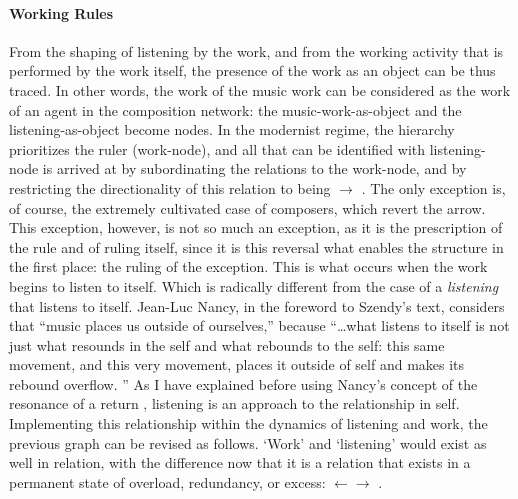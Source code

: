 \paragraph{Working Rules}
From the shaping of listening by the work, and from the working activity that is performed by the work itself, the presence of the work as an object can be thus traced. In other words, the work of the music work can be considered as the work of an agent in the composition network: the music-work-as-object and the listening-as-object become nodes. In the modernist regime, the hierarchy prioritizes the ruler (work-node), and all that can be identified with listening-node is arrived at by subordinating the relations to the work-node, and by restricting the directionality of this relation to being  $\rightarrow$ . The only exception is, of course, the extremely cultivated case of composers, which revert the arrow. This exception, however, is not so much an exception, as it is the prescription of the rule and of ruling itself, since it is this reversal what enables the structure in the first place: the ruling of the exception. This is what occurs when the work begins to listen to itself. Which is radically different from the case of a \textit{listening} that listens to itself. Jean-Luc Nancy, in the foreword to Szendy's text, considers that ``music places us outside of ourselves,'' because ``\dots what listens to itself is not just what resounds in the self and what rebounds to the self: this same movement, and this very movement, places it outside of self and makes its rebound overflow. \parencite[xii]{Sze08:Lis}'' As I have explained before using Nancy's concept of the resonance of a return , listening is an approach to the relationship in self. Implementing this relationship within the dynamics of listening and work, the previous graph can be revised as follows. `Work' and `listening' would exist as well in relation, with the difference now that it is a relation that exists in a permanent state of overload, redundancy, or excess:  $\leftarrow\rightarrow$ . 

